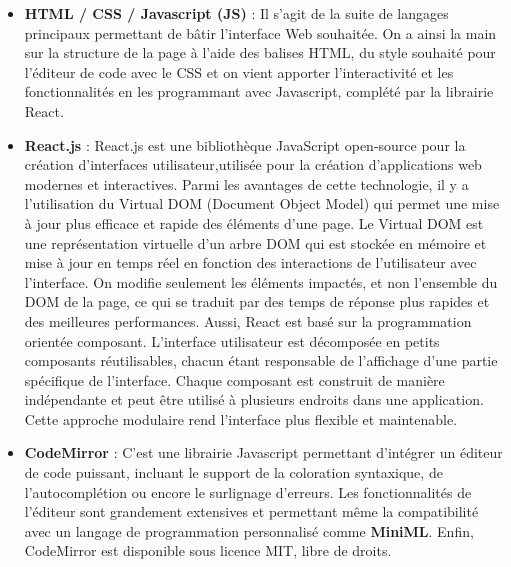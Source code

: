 \documentclass[
  12pt,
]{article}
\begin{document}
\begin{itemize}
\item
  \textbf{HTML / CSS / Javascript (JS)} : Il s'agit de la suite de
  langages principaux permettant de bâtir l'interface Web souhaitée. On
  a ainsi la main sur la structure de la page à l'aide des balises HTML,
  du style souhaité pour l'éditeur de code avec le CSS et on vient
  apporter l'interactivité et les fonctionnalités en les programmant
  avec Javascript, complété par la librairie React.
\item
  \textbf{React.js} : React.js est une bibliothèque JavaScript
  open-source pour la création d'interfaces utilisateur,utilisée pour la
  création d'applications web modernes et interactives. Parmi les
  avantages de cette technologie, il y a l'utilisation du Virtual DOM
  (Document Object Model) qui permet une mise à jour plus efficace et
  rapide des éléments d'une page. Le Virtual DOM est une représentation
  virtuelle d'un arbre DOM qui est stockée en mémoire et mise à jour en
  temps réel en fonction des interactions de l'utilisateur avec
  l'interface. On modifie seulement les éléments impactés, et non
  l'ensemble du DOM de la page, ce qui se traduit par des temps de
  réponse plus rapides et des meilleures performances. Aussi, React est
  basé sur la programmation orientée composant. L'interface utilisateur
  est décomposée en petits composants réutilisables, chacun étant
  responsable de l'affichage d'une partie spécifique de l'interface.
  Chaque composant est construit de manière indépendante et peut être
  utilisé à plusieurs endroits dans une application. Cette approche
  modulaire rend l'interface plus flexible et maintenable.
\item
  \textbf{CodeMirror} : C'est une librairie Javascript permettant
  d'intégrer un éditeur de code puissant, incluant le support de la
  coloration syntaxique, de l'autocomplétion ou encore le surlignage
  d'erreurs. Les fonctionnalités de l'éditeur sont grandement extensives
  et permettant même la compatibilité avec un langage de programmation
  personnalisé comme \textbf{MiniML}. Enfin, CodeMirror est disponible
  sous licence MIT, libre de droits.
\end{itemize}

\newpage
\end{document}
